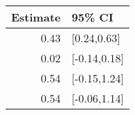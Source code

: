 \begin{tabular}{rl}
  \hline
Estimate & 95\% CI \\ 
  \hline
0.43 & [0.24,0.63] \\ 
  0.02 & [-0.14,0.18] \\ 
  0.54 & [-0.15,1.24] \\ 
  0.54 & [-0.06,1.14] \\ 
   \hline
\end{tabular}

